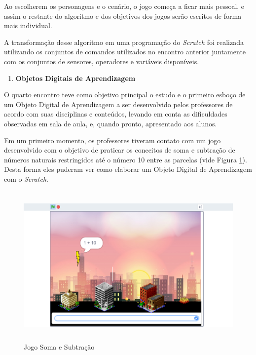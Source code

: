 \documentclass[12pt, openright, a4paper, brazil, english, french, spanish, bibjustif, openany, oneside]{abntex2}
\begin{document}
Ao escolherem os personagens e o cenário, o jogo começa a ficar mais pessoal, e assim o restante do algoritmo e dos objetivos dos jogos serão escritos de forma mais individual.

A transformação desse algoritmo em uma programação do \textit{Scratch} foi realizada utilizando os conjuntos de comandos utilizados no encontro anterior juntamente com os conjuntos de sensores, operadores e variáveis disponíveis.



\begin{enumerate}[resume,label=\textbf{\arabic*.}]

\item \textbf{Objetos Digitais de Aprendizagem}

\end{enumerate}

O quarto encontro teve como objetivo principal o estudo e o primeiro esboço de um Objeto Digital de Aprendizagem a ser desenvolvido pelos professores de acordo com suas disciplinas e conteúdos, levando em conta as dificuldades observadas em sala de aula, e, quando pronto, apresentado aos alunos.

Em um primeiro momento, os professores tiveram contato com um jogo desenvolvido com o objetivo de praticar os conceitos de soma e subtração de números naturais restringidos até o número 10 entre as parcelas (vide Figura \ref{somaesub}). Desta forma eles puderam ver como elaborar um Objeto Digital de Aprendizagem com o \textit{Scratch}.

\begin{figure}[H]

    \center
    \caption{Jogo Soma e Subtração \label{somaesub}}
    \includegraphics[height=8cm]{somaesub.png}
    
\end{figure}
\end{document}
